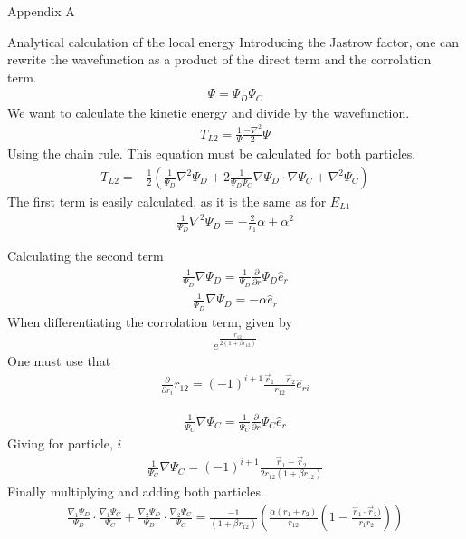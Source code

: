 \documentclass[a4paper, 12pt, titlepage]{article}
\begin{document}
\begin{section}{Appendix A}
\begin{subsection}{Analytical calculation of the local energy}
 Introducing the Jastrow factor, one can rewrite the wavefunction
 as a product of the direct term and the corrolation term. 
 \begin{align*}
 	\Psi = \Psi_D \Psi_C
 \end{align*}
 We want to calculate the kinetic energy and divide by the wavefunction.
 \begin{align*}
 	T_{L2} = \frac{1}{\Psi} \frac{-\nabla^2}{2} \Psi
 \end{align*}
 Using the chain rule. This equation must be calculated for both particles. 
 \begin{align}
 	T_{L2} = -\frac{1}{2} \left( \frac{1}{\Psi_D}\nabla^2 \Psi_D + 2 \frac{1}{\Psi_D \Psi_C} \nabla \Psi_D \cdot \nabla \Psi_C + \nabla^2 \Psi_C \right)
 	\label{T_L2}
 \end{align}
 The first term is easily calculated, as it is the same as for $E_{L1}$
 \begin{align*}
 	\frac{1}{\Psi_D}\nabla^2 \Psi_D =  -\frac{2}{r_1}\alpha + \alpha^2 
 \end{align*}

 Calculating the second term
 \begin{align*}
 	\frac{1}{\Psi_D} \nabla \Psi_D = \frac{1}{\Psi_D} \frac{\partial}{\partial r} \Psi_D \hat e_r 
 \end{align*}
 \begin{align}
 	\frac{1}{\Psi_D} \nabla \Psi_D = -\alpha \hat e_r
 \end{align}
 When differentiating the corrolation term, given by
 \begin{align*}
 	e^{\frac{r_{12}}{2\left(1 + \beta r_{12} \right)}}
 \end{align*}
 One must use that
 \begin{align}
 	\frac{\partial}{\partial r_i} r_{12} = (-1)^{i+1} \frac{\vec r_1 - \vec r_2}{r_{12}} \hat e_{ri}
 \end{align}

 \begin{align*}
 	\frac{1}{\Psi_C} \nabla \Psi_C = \frac{1}{\Psi_C} \frac{\partial}{\partial r} \Psi_C \hat e_r 
 \end{align*}
 Giving for particle, $i$
 \begin{align*}
 	\frac{1}{\Psi_C} \nabla \Psi_C = (-1)^{i+1} \frac{\vec r_1 - \vec r_2}{2r_{12} \left(1+\beta r_{12} \right)}
 \end{align*}
 Finally multiplying and adding both particles. 
 \begin{align}
 	\frac{\nabla_1 \Psi_D}{\Psi_D} \cdot \frac{\nabla_1 \Psi_C }{\Psi_C} + \frac{\nabla_2 \Psi_D}{\Psi_D}  \cdot \frac{\nabla_2 \Psi_C}{\Psi_C}  = \frac{-1}{\left(1+\beta r_{12} \right)} \left( \frac{\alpha(r_1 + r_2)}{r_{12}} \left(1 - \frac{\vec r_1 \cdot \vec r_2)}{r_1 r_2} \right)  \right)
 \end{align} 


\end{subsection}
\end{section}
\end{document}
